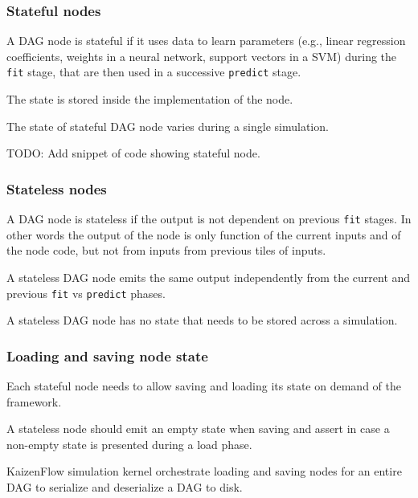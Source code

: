 \documentclass[11pt, reqno]{amsart}
\theoremstyle{definition}
\theoremstyle{remark}
\begin{document}

  \subsubsection{Stateful nodes}

  A DAG node is stateful if it uses data to learn parameters (e.g., linear regression
  coefficients, weights in a neural network, support vectors in a SVM) during
  the \verb|fit| stage, that are then used in a successive \verb|predict| stage.

  The state is stored inside the implementation of the node.

  The state of stateful DAG node varies during a single simulation.

  TODO: Add snippet of code showing stateful node.

  \subsubsection{Stateless nodes}
  A DAG node is stateless if the output is not dependent on previous \verb|fit|
  stages. In other words the output of the node is only function of the current inputs
  and of the node code, but not from inputs from previous tiles of inputs.

  A stateless DAG node emits the same output independently from the current and
  previous \verb|fit| vs \verb|predict| phases.

  A stateless DAG node has no state that needs to be stored across a simulation.

  \subsubsection{Loading and saving node state}

  Each stateful node needs to allow saving and loading its state on demand of the
  framework.

  A stateless node should emit an empty state when saving and assert in case a non-empty
  state is presented during a load phase.

  KaizenFlow simulation kernel orchestrate loading and saving nodes for an entire
  DAG to serialize and deserialize a DAG to disk.
\end{document}
